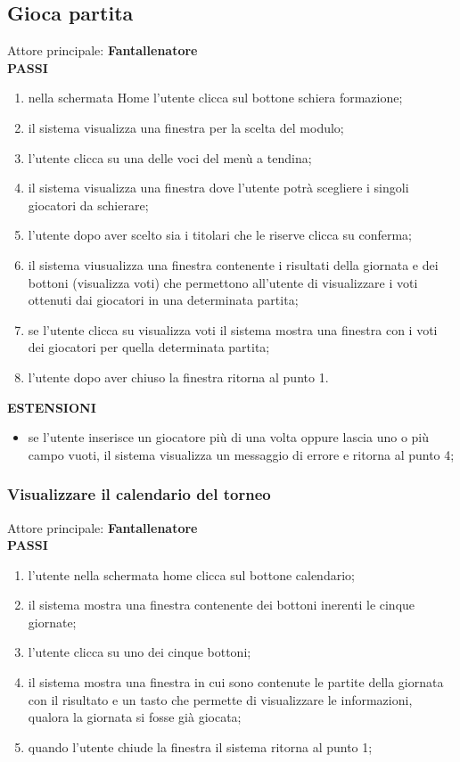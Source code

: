\documentclass[12pt,a4paper]{article}
\begin{document}
\subsection{Gioca partita}
Attore principale: \textbf{Fantallenatore}\\
\newline
\textbf{PASSI}
\begin{enumerate}
\item nella schermata Home l'utente clicca sul bottone schiera formazione;
\item il sistema visualizza una finestra per la scelta del modulo;
\item l'utente clicca su una delle voci del menù a tendina;
\item il sistema visualizza una finestra dove l'utente potrà scegliere i singoli giocatori da schierare;
\item l'utente dopo aver scelto sia i titolari che le riserve clicca su conferma;
\item il sistema viusualizza una finestra contenente i risultati della giornata e dei bottoni (visualizza voti) che permettono all'utente di visualizzare i voti ottenuti dai giocatori in una determinata partita;
\item se l'utente clicca su visualizza voti il sistema mostra una finestra con i voti dei giocatori per quella determinata partita;
\item l'utente dopo aver chiuso la finestra ritorna al punto 1.
\end{enumerate}
\textbf{ESTENSIONI}
\begin{itemize}
\item se l'utente inserisce un giocatore più di una volta oppure lascia uno o più campo vuoti, il sistema visualizza un messaggio di errore e ritorna al punto 4;
\end{itemize}
\subsubsection{Visualizzare il calendario del torneo}
Attore principale: \textbf{Fantallenatore}\\
\newline
\textbf{PASSI}
\begin{enumerate}
\item l'utente nella schermata home clicca sul bottone calendario;
\item il sistema mostra una finestra contenente dei bottoni inerenti le cinque giornate;
\item l'utente clicca su uno dei cinque bottoni;
\item il sistema mostra una finestra in cui sono contenute le partite della giornata con il risultato e un tasto che permette di visualizzare le informazioni, qualora la giornata si fosse già giocata;
\item quando l'utente chiude la finestra il sistema ritorna al punto 1;
\end{enumerate}
\end{document}
